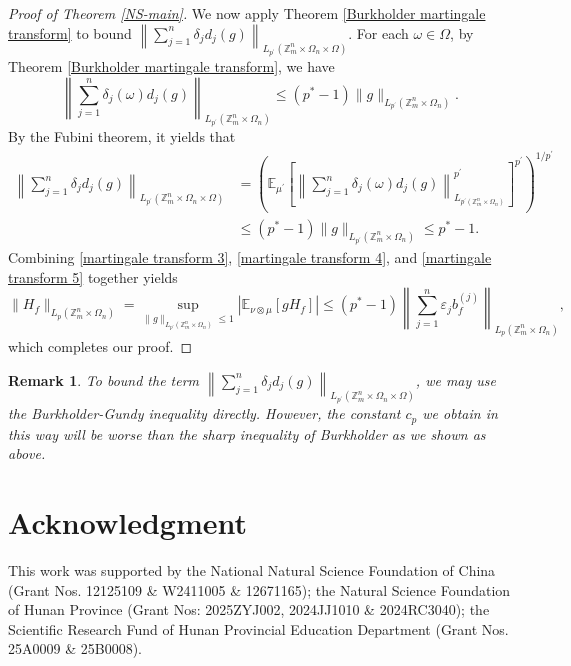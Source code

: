 \documentclass{amsart}
\numberwithin{equation}{section}
\newtheorem{rem}[thm]{Remark}
\newcommand{\Z}{{\mathbb{Z}^{n}_{m}}}
\begin{document}
\begin{proof}[Proof of Theorem \ref{NS-main}]
We now apply Theorem \ref{Burkholder martingale transform} to bound $\left\|\sum_{j=1}^{n}\delta_{j}d_{j}(g)\right\|_{L_{p^{\prime}}(\Z\times \Omega_{n}\times \Omega)}$. For each $\omega\in \Omega$, by Theorem \ref{Burkholder martingale transform}, we have
\[
\left\|\sum_{j=1}^{n}\delta_{j}(\omega)d_{j}(g)\right\|_{L_{p^{\prime}}(\Z\times \Omega_{n})}\leq (p^{*}-1)\|g\|_{L_{p^{\prime}}(\Z\times \Omega_{n})}.
\]
By the Fubini theorem, it yields that
\begin{equation}\label{martingale transform 5}
\begin{split}
\left\|\sum_{j=1}^{n}\delta_{j}d_{j}(g)\right\|_{L_{p^{\prime}}(\Z\times \Omega_{n}\times \Omega)}&=\left(\mathbb{E}_{\mu^{\prime}}\left[\left\|\sum_{j=1}^{n}\delta_{j}(\omega)d_{j}(g)\right\|^{p^{\prime}}_{L_{p^{\prime}(\Z\times \Omega_{n})}}\right]^{p^{\prime}}\right)^{1/p^{\prime}}\\
&\leq (p^{*}-1)\|g\|_{L_{p^{\prime}}(\Z\times \Omega_{n})}\leq p^{*}-1.
\end{split}
\end{equation}
Combining \eqref{martingale transform 3}, \eqref{martingale transform 4}, and \eqref{martingale transform 5} together yields
\[
\|H_{f}\|_{L_{p}(\Z\times \Omega_{n})}=\sup_{\|g\|_{L_{p^{\prime}}(\Z\times \Omega_{n})}\leq 1}|\mathbb{E}_{\nu\otimes \mu}[gH_{f}]|\leq (p^{*}-1)\left\|\sum_{j=1}^{n}\varepsilon_{j}b^{(j)}_{f}\right\|_{L_{p}(\Z\times \Omega_{n})},
\]
which completes our proof.
\end{proof}


\begin{rem}
To bound the term $\left\|\sum_{j=1}^{n}\delta_{j}d_{j}(g)\right\|_{L_{p^{\prime}}(\Z\times \Omega_{n}\times \Omega)}$, we may use the Burkholder-Gundy inequality directly. However, the constant $c_{p}$ we obtain in this way will be worse than the sharp inequality of Burkholder as we shown as above.
\end{rem}

\section*{Acknowledgment}

This work was supported by the National Natural Science Foundation of China (Grant Nos. 12125109 \& W2411005 \& 12671165); the Natural Science Foundation of Hunan Province (Grant Nos: 2025ZYJ002, 2024JJ1010 \& 2024RC3040); the Scientific Research Fund of Hunan Provincial Education Department (Grant Nos. 25A0009 \& 25B0008).
\end{document}
